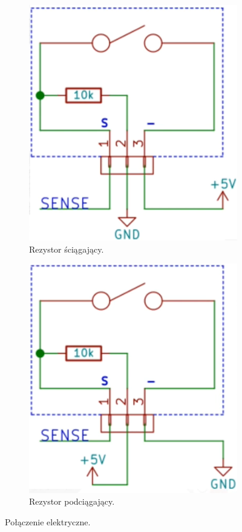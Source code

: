 \documentclass[11pt, a4paper]{article}
\begin{document}
\begin{figure}[h]
\centering
\begin{subfigure}{.4\textwidth}
  \centering
  \includegraphics[width=.5\linewidth]{fig/Czujnik_przechylenia_KY020/polaczenie_modulu/12_pulldown.png}
  \caption{Rezystor ściągający.}
  \label{fig:12pd}
\end{subfigure}
\begin{subfigure}{.4\textwidth}
  \centering
  \includegraphics[width=.5\linewidth]{fig/Czujnik_przechylenia_KY020/polaczenie_modulu/12_pullup.png}
  \caption{Rezystor podciągający.}
  \label{fig:sub2}
\end{subfigure}
\caption{Połączenie elektryczne.}
\label{fig:12}
\end{figure}
\end{document}
